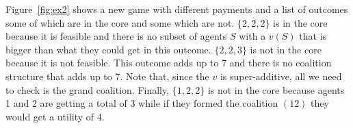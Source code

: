\begin{SCfigure}
  \begin{minipage}{1.0\linewidth}
  \begin{center}
  \end{center}
  \end{minipage}
  \caption{Sample game showing some outcomes that are
    in the core and some that are not. The characteristic function
    $v$ is super-additive.}
  \label{fig:ex2}
\end{SCfigure}


  Figure~\ref{fig:ex2}
shows a new game with different payments and a list of outcomes some
of which are in the core and some which are not.  $\{2,2,2\}$ is in
the core because it is feasible and there is no subset of agents $S$
with a $v(S)$ that is bigger than what they could get in this outcome.
$\{2,2,3\}$ is not in the core because it is not feasible. This
outcome adds up to 7 and there is no coalition structure that adds up
to 7. Note that, since the $v$ is super-additive, all we need to check
is the grand coalition. Finally, $\{1,2,2\}$ is not in the core
because agents 1 and 2 are getting a total of 3 while if they formed
the coalition $(12)$ they would get a utility of 4.

